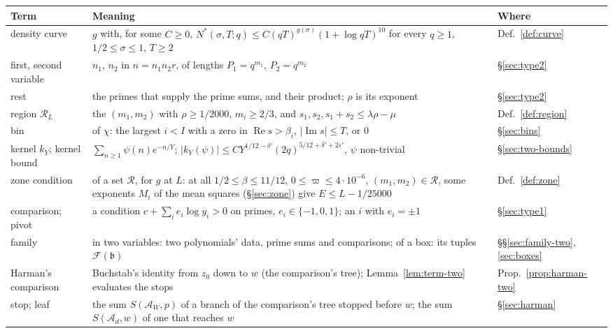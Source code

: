 \documentclass[11pt]{article}
\theoremstyle{definition}
\begin{document}
{\footnotesize
\setlength{\tabcolsep}{4pt}
\begin{longtable}{@{}>{\raggedright\arraybackslash}p{}
  >{\raggedright\arraybackslash}p{}
  >{\raggedright\arraybackslash}p{}@{}}
\toprule
Term & Meaning & Where \\
\midrule
\endhead
density curve & $g$ with, for some $C \ge 0$, $N^*(\sigma, T; q) \le C(qT)^{g(\sigma)}(1 + \log qT)^{10}$ for every
  $q \ge 1$, $1/2 \le \sigma \le 1$, $T \ge 2$ & Def.~\ref{def:curve} \\
first, second variable & $n_1$, $n_2$ in $n = n_1 n_2 r$, of lengths $P_1 = q^{m_1}$, $P_2 = q^{m_2}$ &
  \S\ref{sec:type2} \\
rest & the primes that supply the prime sums, and their product; $\rho$ is its exponent & \S\ref{sec:type2} \\
region $\mathcal R_L$ & the $(m_1, m_2)$ with $\rho \ge 1/2000$, $m_i \ge 2/3$, and $s_1, s_2, s_1 + s_2 \le
  \lambda\rho - \mu$ &
  Def.~\ref{def:region} \\
bin & of $\chi$: the largest $i < I$ with a zero in $\operatorname{Re} s > \beta_i$, $|\operatorname{Im} s| \le T$, or
  $0$ & \S\ref{sec:bins} \\
kernel $k_Y$; kernel bound & $\sum_{n \ge 1} \psi(n) e^{-n/Y}$; $|k_Y(\psi)| \le C Y^{1/12 - \delta'} (2q)^{5/12 +
  \delta' + 2\varepsilon'}$, $\psi$ non-trivial & \S\ref{sec:two-bounds} \\
zone condition & of a set $\mathcal R$, for $g$ at $L$: at all $1/2 \le \beta \le 11/12$, $0 \le \varpi \le 4 \cdot
  10^{-6}$, $(m_1, m_2) \in \mathcal R$, some exponents $M_i$ of the mean squares (\S\ref{sec:zone}) give $E \le L -
  1/25000$ & Def.~\ref{def:zone} \\
comparison; pivot & a condition $c + \sum_i e_i \log y_i > 0$ on primes, $e_i \in \{-1, 0, 1\}$; an $i$ with $e_i =
  \pm 1$ & \S\ref{sec:type1} \\
family & in two variables: two polynomials' data, prime sums and comparisons; of a box: its tuples $\mathcal
  F(\mathfrak b)$ & \S\S\ref{sec:family-two}, \ref{sec:boxes} \\
Harman's comparison & Buchstab's identity from $z_0$ down to $w$ (the comparison's tree); Lemma~\ref{lem:term-two}
  evaluates the stops &
  Prop.~\ref{prop:harman-two} \\
stop; leaf & the sum $S(\mathcal A_W, p)$ of a branch of the comparison's tree stopped before $w$; the sum
  $S(\mathcal A_d, w)$ of one that reaches $w$ & \S\ref{sec:harman} \\

\end{longtable}}
\end{document}

